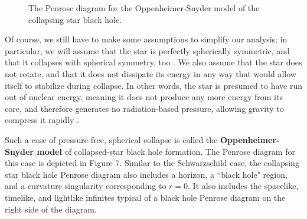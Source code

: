 \documentclass{article}
\begin{document}
\begin{wrapfigure}{r}{0.4\textwidth}
\begin{center}
\end{center}


\vspace{-60pt}
\caption{The Penrose diagram for the Oppenheimer-Snyder model of the collapsing star black hole.}
\label{fig:penrose_collapsing_star}

\end{wrapfigure}

Of course, we still have to make some assumptions to simplify our analysis; in particular, we will assume that the star is perfectly spherically symmetric, and that it collapses with spherical symmetry, too \cite{O_S_blackhole}. We also assume that the star does not rotate, and that it does not dissipate its energy in any way that would allow itself to stabilize during collapse. In other words, the star is presumed to have run out of nuclear energy, meaning it does not produce any more energy from its core, and therefore generates no radiation-based pressure, allowing gravity to compress it rapidly \cite{O_S_blackhole}.

Such a case of pressure-free, spherical collapse is called the \textbf{Oppenheimer-Snyder model} of collapsed-star black hole formation. The Penrose diagram for this case is depicted in Figure 7. Similar to the Schwarzschild case, the collapsing star black hole Penrose diagram also includes a horizon, a ``black hole" region, and a curvature singularity corresponding to $r=0$. It also includes the spacelike, timelike, and lightlike infinites typical of a black hole Penrose diagram on the right side of the diagram.
\end{document}
